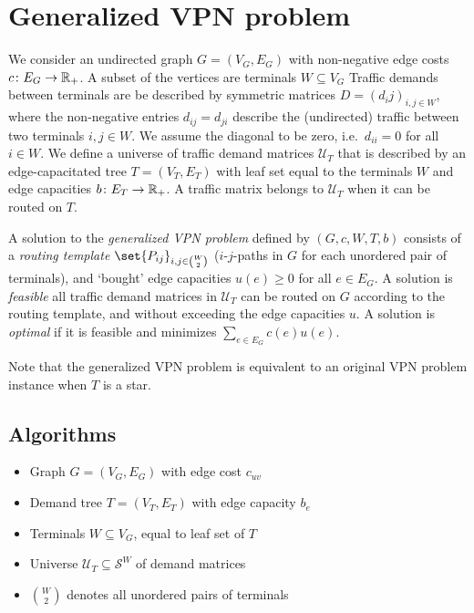 \section{Generalized VPN problem}
We consider an undirected graph $G = (V_G, E_G)$ with non-negative edge costs $c\colon E_G \to \mathbb{R}_+$.
A subset of the vertices are terminals $W \subseteq V_G$
Traffic demands between terminals are be described by symmetric matrices $D = (d_ij)_{i,j \in W}$, where the non-negative entries $d_{ij} = d_{ji}$ describe the (undirected) traffic between two terminals $i,j \in W$.
We assume the diagonal to be zero, i.e.\ $d_{ii} = 0$ for all $i \in W$.
We define a universe of traffic demand matrices $\mathcal U_T$ that is described by an edge-capacitated tree $T = (V_T, E_T)$ with leaf set equal to the terminals $W$ and edge capacities $b\colon E_T \to \mathbb{R}_+$.
A traffic matrix belongs to $\mathcal U_T$ when it can be routed on $T$.

A solution to the \emph{generalized VPN problem} defined by $(G, c, W, T, b)$ consists of a \emph{routing template} $\set{P_{ij}}_{i,j \in \binom{W}{2}}$ ($i$-$j$-paths in $G$ for each unordered pair of terminals), and `bought' edge capacities $u(e) \ge 0$ for all $e \in E_G$.
A solution is \emph{feasible} all traffic demand matrices in $\mathcal U_T$ can be routed on $G$ according to the routing template, and without exceeding the edge capacities $u$.
A solution is \emph{optimal} if it is feasible and minimizes $\sum_{e \in E_G} c(e) u(e)$.

Note that the generalized VPN problem is equivalent to an original VPN problem instance when $T$ is a star.

\subsection{Algorithms}

\begin{itemize}
    \item Graph $G = (V_G, E_G)$ with edge cost $c_{uv}$
    \item Demand tree $T = (V_T, E_T)$ with edge capacity $b_e$
    \item Terminals $W \subseteq V_G$, equal to leaf set of $T$
    \item Universe $\mathcal U_T \subseteq \mathcal S^W$ of demand matrices
    \item $\binom{W}{2}$ denotes all unordered pairs of terminals
\end{itemize}

